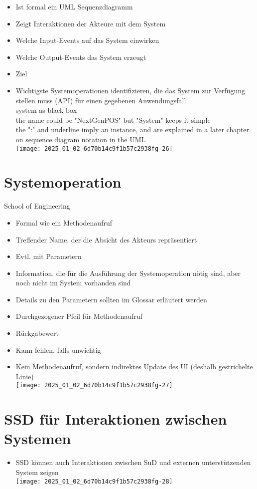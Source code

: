 \documentclass[10pt]{article}
\begin{document}
\begin{itemize}
  \item Ist formal ein UML Sequenzdiagramm
  \item Zeigt Interaktionen der Akteure mit dem System
  \item Welche Input-Events auf das System einwirken
  \item Welche Output-Events das System erzeugt
  \item Ziel
  \item Wichtigste Systemoperationen identifizieren, die das System zur Verfügung stellen muss (API) für einen gegebenen Anwendungsfall\\
system as black box\\
the name could be "NextGenPOS" but "System" keeps it simple\\
the ":" and underline imply an instance, and are explained in a later chapter on sequence diagram notation in the UML\\
\texttt{[image: 2025\_01\_02\_6d70b14c9f1b57c2938fg-26]}
\end{itemize}

\section*{Systemoperation}
School of Engineering

\begin{itemize}
  \item Formal wie ein Methodenaufruf
  \item Treffender Name, der die Absicht des Akteurs repräsentiert
  \item Evtl. mit Parametern
  \item Information, die für die Ausführung der Systemoperation nötig sind, aber noch nicht im System vorhanden sind
  \item Details zu den Parametern sollten im Glossar erläutert werden
  \item Durchgezogener Pfeil für Methodenaufruf
  \item Rückgabewert
  \item Kann fehlen, falls unwichtig
  \item Kein Methodenaufruf, sondern indirektes Update des UI (deshalb gestrichelte Linie)\\
\texttt{[image: 2025\_01\_02\_6d70b14c9f1b57c2938fg-27]}
\end{itemize}

\section*{SSD für Interaktionen zwischen Systemen}
\begin{itemize}
  \item SSD können auch Interaktionen zwischen SuD und externen unterstützenden System zeigen\\
\texttt{[image: 2025\_01\_02\_6d70b14c9f1b57c2938fg-28]}
\end{itemize}
\end{document}
